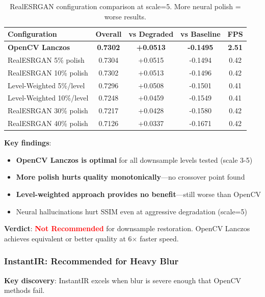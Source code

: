 \documentclass[11pt,a4paper]{article}
\begin{document}
\begin{table}[h]
\centering
\begin{tabular}{lcccc}
\toprule
\textbf{Configuration} & \textbf{Overall} & \textbf{vs Degraded} & \textbf{vs Baseline} & \textbf{FPS} \\
\midrule
\textbf{OpenCV Lanczos} & \textbf{0.7302} & \textbf{+0.0513} & \textbf{-0.1495} & \textbf{2.51} \\
RealESRGAN 5\% polish & 0.7304 & +0.0515 & -0.1494 & 0.42 \\
RealESRGAN 10\% polish & 0.7302 & +0.0513 & -0.1496 & 0.42 \\
Level-Weighted 5\%/level & 0.7296 & +0.0508 & -0.1501 & 0.41 \\
Level-Weighted 10\%/level & 0.7248 & +0.0459 & -0.1549 & 0.41 \\
RealESRGAN 30\% polish & 0.7217 & +0.0428 & -0.1580 & 0.42 \\
RealESRGAN 40\% polish & 0.7126 & +0.0337 & -0.1671 & 0.42 \\
\bottomrule
\end{tabular}
\caption{RealESRGAN configuration comparison at scale=5. More neural polish = worse results.}
\label{tab:realesrgan-config}
\end{table}

\textbf{Key findings}:
\begin{itemize}
    \item \textbf{OpenCV Lanczos is optimal} for all downsample levels tested (scale 3-5)
    \item \textbf{More polish hurts quality monotonically}---no crossover point found
    \item \textbf{Level-weighted approach provides no benefit}---still worse than OpenCV
    \item Neural hallucinations hurt SSIM even at aggressive degradation (scale=5)
\end{itemize}

\textbf{Verdict}: \textcolor{red}{\textbf{Not Recommended}} for downsample restoration. OpenCV Lanczos achieves equivalent or better quality at 6$\times$ faster speed.

\subsubsection{InstantIR: Recommended for Heavy Blur}

\textbf{Key discovery}: InstantIR excels when blur is severe enough that OpenCV methods fail.
\end{document}
